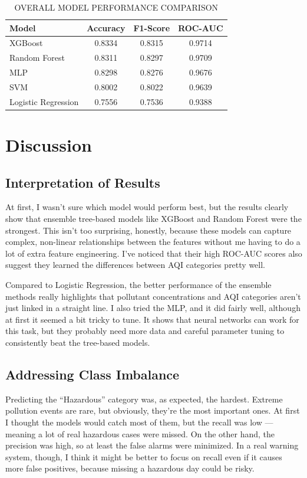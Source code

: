\documentclass[a4paper,fleqn]{cas-dc}
\begin{document}
\vspace{1cm}




\begin{table}[h!]
\centering
\caption{OVERALL MODEL PERFORMANCE COMPARISON}
\label{tab:overall_results}
\begin{tabular}{|l|c|c|c|}
\hline
\textbf{Model} & \textbf{Accuracy} & \textbf{F1-Score} & \textbf{ROC-AUC} \\
\hline
XGBoost & 0.8334 & 0.8315 & 0.9714 \\
Random Forest & 0.8311 & 0.8297 & 0.9709 \\
MLP & 0.8298 & 0.8276 & 0.9676 \\
SVM & 0.8002 & 0.8022 & 0.9639 \\
Logistic Regression & 0.7556 & 0.7536 & 0.9388 \\
\hline
\end{tabular}
\end{table}





\section{Discussion}

\subsection{Interpretation of Results}
At first, I wasn’t sure which model would perform best, but the results clearly show that ensemble tree-based models like XGBoost and Random Forest were the strongest. This isn’t too surprising, honestly, because these models can capture complex, non-linear relationships between the features without me having to do a lot of extra feature engineering. I’ve noticed that their high ROC-AUC scores also suggest they learned the differences between AQI categories pretty well.

Compared to Logistic Regression, the better performance of the ensemble methods really highlights that pollutant concentrations and AQI categories aren’t just linked in a straight line. I also tried the MLP, and it did fairly well, although at first it seemed a bit tricky to tune. It shows that neural networks can work for this task, but they probably need more data and careful parameter tuning to consistently beat the tree-based models.

\subsection{Addressing Class Imbalance}
Predicting the ``Hazardous'' category was, as expected, the hardest. Extreme pollution events are rare, but obviously, they’re the most important ones. At first I thought the models would catch most of them, but the recall was low — meaning a lot of real hazardous cases were missed. On the other hand, the precision was high, so at least the false alarms were minimized. In a real warning system, though, I think it might be better to focus on recall even if it causes more false positives, because missing a hazardous day could be risky.
\end{document}
